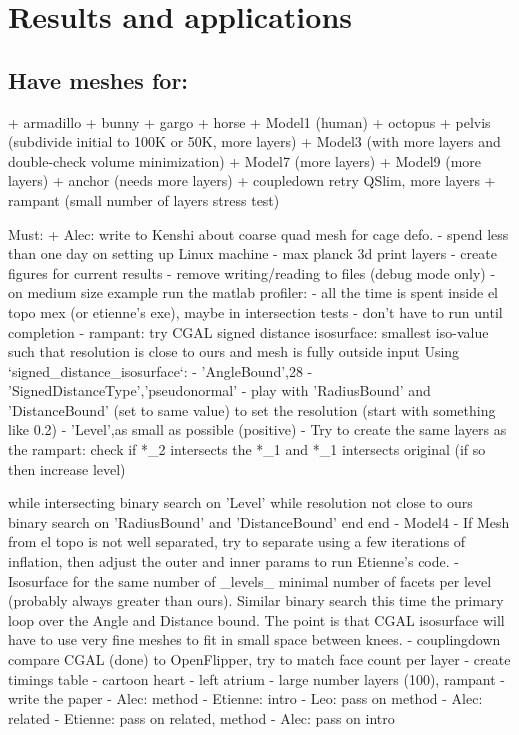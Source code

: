 
\section{Results and applications}
\label{sec:results}

\subsection{Have meshes for:}
  + armadillo
  + bunny
  + gargo
  + horse
  + Model1 (human)
  + octopus
  + pelvis (subdivide initial to 100K or 50K, more layers)
  + Model3 (with more layers and double-check volume minimization)
  + Model7 (more layers)
  + Model9 (more layers)
  + anchor (needs more layers)
  + coupledown retry QSlim, more layers
  + rampant (small number of layers stress test)

Must:
  + Alec: write to Kenshi about coarse quad mesh for cage defo.
  - spend less than one day on setting up Linux machine
  - max planck 3d print layers
  - create figures for current results
  - remove writing/reading to files (debug mode only)
  - on medium size example run the matlab profiler:
    - all the time is spent inside el topo mex (or etienne's exe), maybe in
      intersection tests
    - don't have to run until completion
  - rampant: try CGAL signed distance isosurface: smallest iso-value such that
    resolution is close to ours and mesh is fully outside input
    Using `signed\_distance\_isosurface`:
    - 'AngleBound',28 
    - 'SignedDistanceType','pseudonormal'
    - play with 'RadiusBound' and 'DistanceBound' (set to same value) to set the
      resolution (start with something like 0.2)
    - 'Level',as small as possible (positive)
    - Try to create the same layers as the rampart: check if *\_2 intersects the
      *\_1 and *\_1 intersects original (if so then increase level)
  
    while intersecting
      binary search on 'Level'
      while resolution not close to ours
        binary search on 'RadiusBound' and 'DistanceBound'
      end
    end
  - Model4
    - If Mesh from el topo is not well separated, try to separate using a few
      iterations of inflation, then adjust the outer and inner params to run
      Etienne's code.
    - Isosurface for the same number of \_levels\_ minimal number of facets per
      level (probably always greater than ours). Similar binary search this
      time the primary loop over the Angle and Distance bound. The point is
      that CGAL isosurface will have to use very fine meshes to fit in small
      space between knees.
  - couplingdown compare CGAL (done) to OpenFlipper, try to match face count per
    layer
  - create timings table
  - cartoon heart 
  - left atrium
  - large number layers (100), rampant
  - write the paper
  - Alec: method
  - Etienne: intro
  - Leo: pass on method
  - Alec: related
  - Etienne: pass on related, method
  - Alec: pass on intro

